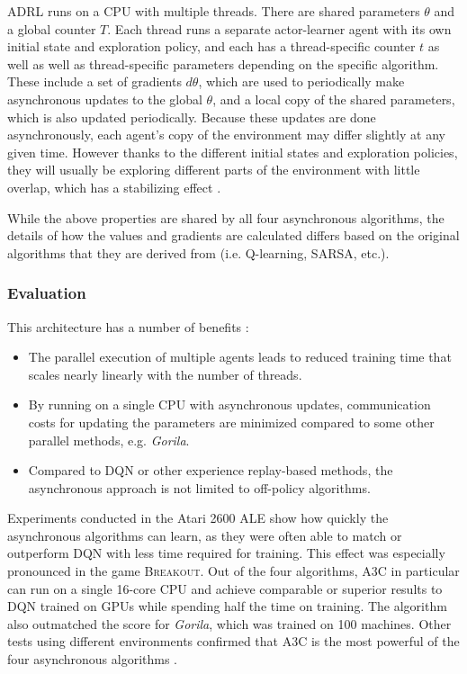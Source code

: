 \documentclass[runningheads]{llncs}
\begin{document}
ADRL runs on a CPU with multiple threads. There are shared parameters $\theta$ and a global counter $T$. Each thread runs a separate actor-learner agent with its own initial state and exploration policy, and each has a thread-specific counter $t$ as well as well as thread-specific parameters depending on the specific algorithm. These include a set of gradients $d\theta$, which are used to periodically make asynchronous updates to the global $\theta$, and a local copy of the shared parameters, which is also updated periodically. Because these updates are done asynchronously, each agent's copy of the environment may differ slightly at any given time. However thanks to the different initial states and exploration policies, they will usually be exploring different parts of the environment with little overlap, which has a stabilizing effect \cite{mnih2016asynchronous}.

While the above properties are shared by all four asynchronous algorithms, the details of how the values and gradients are calculated differs based on the original algorithms that they are derived from (i.e. Q-learning, SARSA, etc.).

\subsubsection{Evaluation}

This architecture has a number of benefits \cite{mnih2016asynchronous}:

\begin{itemize}
    \item The parallel execution of multiple agents leads to reduced training time that scales nearly linearly with the number of threads.
    \item By running on a single CPU with asynchronous updates, communication costs for updating the parameters are minimized compared to some other parallel methods, e.g. \textit{Gorila}.
    \item Compared to DQN or other experience replay-based methods, the asynchronous approach is not limited to off-policy algorithms.
\end{itemize}

Experiments conducted in the Atari 2600 ALE show how quickly the asynchronous algorithms can learn, as they were often able to match or outperform DQN with less time required for training. This effect was especially pronounced in the game \textsc{Breakout}. Out of the four algorithms, A3C in particular can run on a single 16-core CPU and achieve comparable or superior results to DQN trained on GPUs while spending half the time on training. The algorithm also outmatched the score for \textit{Gorila}, which was trained on 100 machines. Other tests using different environments confirmed that A3C is the most powerful of the four asynchronous algorithms \cite{mnih2016asynchronous}.
\end{document}
